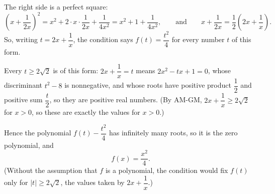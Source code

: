 The right side is a perfect square:
\[\left(x+\dfrac{1}{2x}\right)^2=x^2+2\cdot x\cdot\dfrac{1}{2x}+\dfrac{1}{4x^2}=x^2+1+\dfrac{1}{4x^2},\qquad\text{and}\qquad x+\dfrac{1}{2x}=\dfrac12\left(2x+\dfrac1x\right).\]
So, writing $t=2x+\dfrac1x$, the condition says $f(t)=\dfrac{t^2}{4}$ for every number $t$ of this form.

Every $t\ge2\sqrt2$ is of this form: $2x+\dfrac1x=t$ means $2x^2-tx+1=0$, whose discriminant $t^2-8$ is nonnegative, and whose roots have positive product $\dfrac12$ and positive sum $\dfrac t2$, so they are positive real numbers. (By AM-GM, $2x+\dfrac1x\ge2\sqrt2$ for $x>0$, so these are exactly the values for $x>0$.)

Hence the polynomial $f(t)-\dfrac{t^2}{4}$ has infinitely many roots, so it is the zero polynomial, and
\[\boxed{f(x)=\dfrac{x^2}{4}}.\]
(Without the assumption that $f$ is a polynomial, the condition would fix $f(t)$ only for $|t|\ge2\sqrt2$, the values taken by $2x+\dfrac1x$.)
